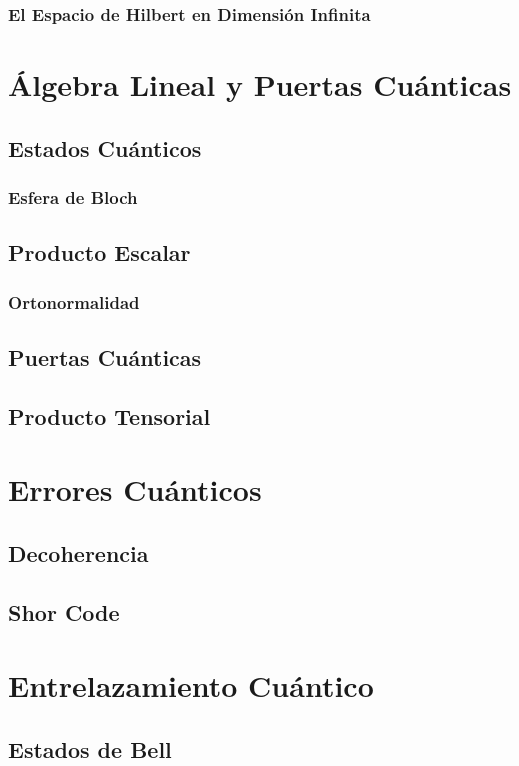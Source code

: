 \documentclass{article}
\numberwithin{equation}{section} %
\begin{document}
    \vspace{5mm}

    \subsubsection{El Espacio de Hilbert en Dimensión Infinita}

    \section{Álgebra Lineal y Puertas Cuánticas}
    \subsection{Estados Cuánticos}
    \subsubsection{Esfera de Bloch}    
    \subsection{Producto Escalar}
    \subsubsection{Ortonormalidad}
    \subsection{Puertas Cuánticas}
    \subsection{Producto Tensorial}
    \section{Errores Cuánticos}
    \subsection{Decoherencia}
    \subsection{Shor Code}
    \section{Entrelazamiento Cuántico}
    \subsection{Estados de Bell}
\end{document}
